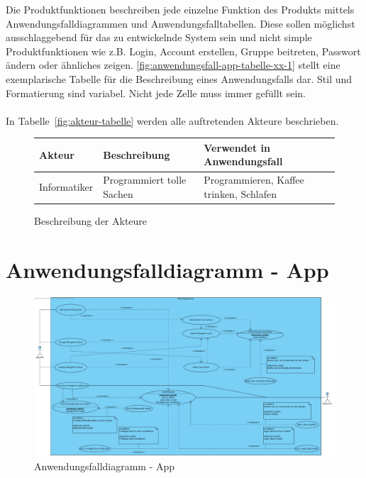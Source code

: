 \graphicspath{{img}} %

\begin{tcolorbox}
Die Produktfunktionen beschreiben jede einzelne Funktion des Produkts mittels Anwendungsfalldiagrammen und Anwendungsfalltabellen.
Diese sollen möglichst ausschlaggebend für das zu entwickelnde System sein und nicht simple Produktfunktionen wie z.B. Login, Account erstellen, Gruppe beitreten, Passwort ändern oder ähnliches zeigen.
\autoref{fig:anwendungsfall-app-tabelle-xx-1} stellt eine exemplarische Tabelle für die Beschreibung eines Anwendungsfalls dar. Stil und Formatierung sind variabel. Nicht jede Zelle muss immer gefüllt sein.
\\\\
In  Tabelle~\autoref{fig:akteur-tabelle} werden alle auftretenden Akteure beschrieben.


\end{tcolorbox}

\begin{figure}[h]
	\centering
	
	\begin{tabularx}{\textwidth}{ p{} | p{} | X }
		\textbf{Akteur} & \textbf{Beschreibung} & \textbf{Verwendet in Anwendungsfall} \\ \hline
		Informatiker & Programmiert tolle Sachen & Programmieren, Kaffee trinken, Schlafen
	\end{tabularx}
	
	\caption{Beschreibung der Akteure}
	\label{fig:akteur-tabelle}
\end{figure}

\newpage

\section{Anwendungsfalldiagramm - App}

\begin{figure}[h]
	\centering
    \includegraphics[width=\linewidth]{img/diagrams/Mobile_Application.pdf}
	\caption{Anwendungsfalldiagramm - App}
	\label{fig:anwendungsfalldiagramm-app}
\end{figure}

